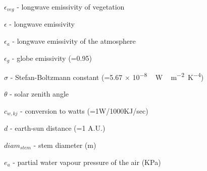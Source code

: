 {\begin{description}
\item $\epsilon _{veg}$  -   longwave emissivity of vegetation
\item $\epsilon$  -   longwave emissivity
\item $\epsilon_{a}$  -  longwave emissivity of the atmosphere 
\item $\epsilon_{g}$  -  globe emissivity (=0.95)  
\item $\sigma$  -   Stefan-Boltzmann constant (=5.67 $\times$ \unit{10^{-8}\,W\,m^{-2}K^{-4}}) 
\item $\theta$  -   solar zenith angle 
\item $c_{w,kj}$  -  conversion to watts (=1W/1000KJ/sec) 
\item $d$  -  earth-sun distance (=1 A.U.) 
\item $diam _{stem}$  -  stem diameter (\unit{m}) 
\item $e_{a}$  -  partial water vapour pressure of the air (\unit{KPa}) 

\end{description}}
